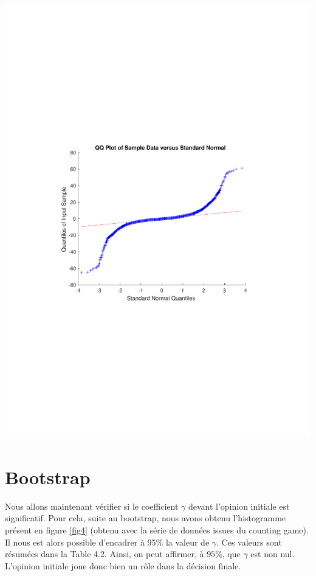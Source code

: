 \documentclass{scrreprt}
\begin{document}
\begin{center}
\includegraphics[trim = 3cm 9cm 3cm 9cm, clip]{qqplot.pdf}
\label{fig3.5}
\end{center}

 

\section{Bootstrap}

Nous allons maintenant vérifier si le coefficient $\gamma$ devant l'opinion initiale est significatif. Pour cela, suite au bootstrap, nous avons obtenu l'histogramme présent en figure \ref{fig4} (obtenu avec la série de données issues du counting game). Il nous est alors possible d'encadrer à 95\% la valeur de $\gamma$. Ces valeurs sont résumées dans la Table 4.2. Ainsi, on peut affirmer, à $95\%$, que $\gamma$ est non nul. L'opinion initiale joue donc bien un rôle dans la décision finale.
\end{document}
